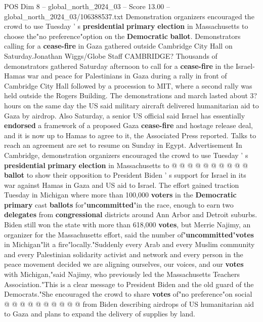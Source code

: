 \begin{textsample}{POS Dim 8 – global\_north\_2024\_03 – Score 13.00 – global\_north\_2024\_03/106388537.txt}  \label{ex:f8_pos_007}
Demonstration organizers encouraged the crowd to use Tuesday ' s \textbf{presidential} \textbf{primary} \textbf{election} in Massachusetts to choose the"no preference"option on the \textbf{Democratic} \textbf{ballot}.
Demonstrators calling for a \textbf{cease-fire} in Gaza gathered outside Cambridge City Hall on Saturday.Jonathan Wiggs/Globe Staff CAMBRIDGE?
Thousands of demonstrators gathered Saturday afternoon to call for a \textbf{cease-fire} in the Israel-Hamas war and peace for Palestinians in Gaza during a rally in front of Cambridge City Hall followed by a procession to MIT, where a second rally was held outside the Rogers Building.
The demonstrations and march lasted about 3? hours on the same day the US said military aircraft delivered humanitarian aid to Gaza by airdrop.
Also Saturday, a senior US official said Israel has essentially \textbf{endorsed} a framework of a proposed Gaza \textbf{cease-fire} and hostage release deal, and it is now up to Hamas to agree to it, the Associated Press reported.
Talks to reach an agreement are set to resume on Sunday in Egypt.
Advertisement In Cambridge, demonstration organizers encouraged the crowd to use Tuesday ' s \textbf{presidential} \textbf{primary} \textbf{election} in Massachusetts to @ @ @ @ @ @ @ @ @ @ \textbf{ballot} to show their opposition to President Biden ' s support for Israel in its war against Hamas in Gaza and US aid to Israel.
The effort gained traction Tuesday in Michigan where more than 100,000 \textbf{voters} in the \textbf{Democratic} \textbf{primary} cast \textbf{ballots} for"\textbf{uncommitted}"in the race, enough to earn two \textbf{delegates} from \textbf{congressional} districts around Ann Arbor and Detroit suburbs.
Biden still won the state with more than 618,000 \textbf{votes}, but Merrie Najimy, an organizer for the Massachusetts effort, said the number of"\textbf{uncommitted}"\textbf{votes} in Michigan"lit a fire"locally."Suddenly every Arab and every Muslim community and every Palestinian solidarity activist and network and every person in the peace movement decided we are aligning ourselves, our voices, and our \textbf{votes} with Michigan,"said Najimy, who previously led the Massachusetts Teachers Association."This is a clear message to President Biden and the old guard of the Democrats."She encouraged the crowd to share \textbf{votes} of"no preference"on social @ @ @ @ @ @ @ @ @ @ from Biden describing airdrops of US humanitarian aid to Gaza and plans to expand the delivery of supplies by land.

\end{textsample}
